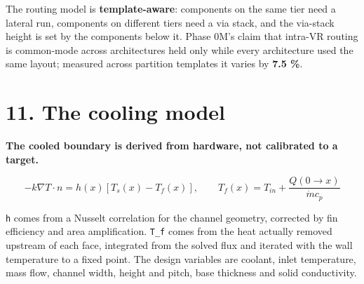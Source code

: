 \documentclass[10pt,]{article}
\begin{document}
The routing model is \textbf{template-aware}: components on the same
tier need a lateral run, components on different tiers need a via stack,
and the via-stack height is set by the components below it. Phase 0M's
claim that intra-VR routing is common-mode across architectures held
only while every architecture used the same layout; measured across
partition templates it varies by \textbf{7.5 \%}.

\newpage

\hypertarget{the-cooling-model}{%
\section{11. The cooling model}\label{the-cooling-model}}

\textbf{The cooled boundary is derived from hardware, not calibrated to
a target.}

\[-k \nabla T \cdot n = h(x)\left[T_s(x) - T_f(x)\right], \qquad T_f(x) = T_{in} + \frac{Q(0 \to x)}{\dot{m} c_p}\]

\texttt{h} comes from a Nusselt correlation for the channel geometry,
corrected by fin efficiency and area amplification. \texttt{T\_f} comes
from the heat actually removed upstream of each face, integrated from
the solved flux and iterated with the wall temperature to a fixed point.
The design variables are coolant, inlet temperature, mass flow, channel
width, height and pitch, base thickness and solid conductivity.
\end{document}
